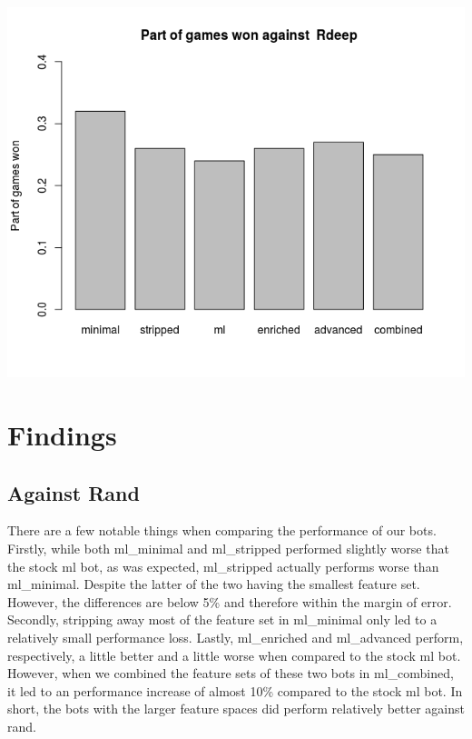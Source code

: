 \documentclass[a4paper,11pt]{article}
\begin{document}
\begin{center}
\begin{minipage}{0.49\linewidth}
\includegraphics[width=\linewidth]{images/barplotRdeep.png}
\end{minipage}
\end{center}
\clearpage
\section{Findings}

\subsection*{Against Rand}
There are a few notable things when comparing the performance of our bots. Firstly, while both ml\_minimal and ml\_stripped performed slightly worse that the stock ml bot, as was expected, ml\_stripped actually performs worse than ml\_minimal. Despite the latter of the two having the smallest feature set. However, the differences are below 5\% and therefore within the margin of error. Secondly, stripping away most of the feature set in ml\_minimal only led to a relatively small performance loss. Lastly, ml\_enriched and ml\_advanced perform, respectively, a little better and a little worse when compared to the stock ml bot. However, when we combined the feature sets of these two bots in ml\_combined, it led to an performance increase of almost 10\% compared to the stock ml bot. In short, the bots with the larger feature spaces did perform relatively better against rand.
\end{document}
